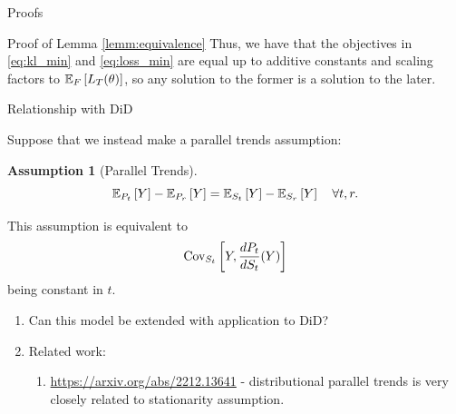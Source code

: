 \documentclass{article}
\theoremstyle{definition}
\newtheorem{assumption}{Assumption}
\theoremstyle{plain}
\theoremstyle{remark}
\begin{document}
\begin{section}{Proofs}
\begin{subsection}{Proof of Lemma \ref{lemm:equivalence}}
Thus, we have that the objectives in \eqref{eq:kl_min} and \eqref{eq:loss_min} are equal up to additive constants and scaling factors to $\EE[F]{L_{T}(\theta)}$, so any solution to the former is a solution to the later.
\end{subsection}

\end{section}

\begin{section}{Relationship with DiD}

Suppose that we instead make a parallel trends assumption:
\begin{assumption}[Parallel Trends]
\[ \EE[P_{t}]{Y} - \EE[P_{r}]{Y} = \EE[S_{t}]{Y} - \EE[S_{r}]{Y} \quad \forall t, r.\]
\end{assumption}

This assumption is equivalent to 
\[\Cov[S_{t}]{Y, \frac{dP_{t}}{dS_{t}}(Y)}\]
being constant in $t$.

\begin{enumerate}
  \item Can this model be extended with application to DiD? 
  \item Related work: 
  \begin{enumerate}
    \item \url{https://arxiv.org/abs/2212.13641} - distributional parallel trends is very closely related to stationarity assumption.
  \end{enumerate}
\end{enumerate}

\end{section}

 

\end{document}
